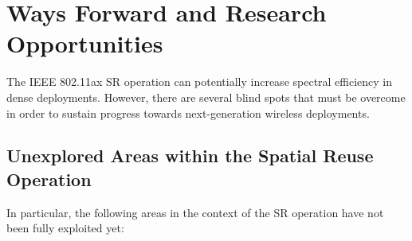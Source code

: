 \documentclass[comsoc]{IEEEtran}
\begin{document}
	\section{Ways Forward and Research Opportunities}
	\label{section:ways_forwad}
	The IEEE 802.11ax SR operation can potentially increase spectral efficiency in dense deployments. However, there are several blind spots that must be overcome in order to sustain progress towards next-generation wireless deployments. 
	
	\subsection{Unexplored Areas within the Spatial Reuse Operation}
	In particular, the following areas in the context of the SR operation have not been fully exploited yet:
\end{document}
